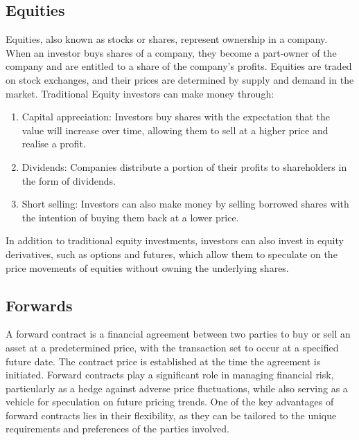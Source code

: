     \subsection{Equities}
        \label{sec:equities}

        Equities, also known as stocks or shares, represent ownership in a company.
        When an investor buys shares of a company,
        they become a part-owner of the company and are entitled to a share of the company's profits.
        Equities are traded on stock exchanges, and their prices are determined by supply and demand in the market.
        Traditional Equity investors can make money through:

        \begin{enumerate}
            \item Capital appreciation: Investors buy shares with the expectation that the value will increase over time,
                allowing them to sell at a higher price and realise a profit.
            \item Dividends: Companies distribute a portion of their profits to shareholders in the form of dividends.
            \item Short selling: Investors can also make money by selling borrowed shares with the intention of buying
                them back at a lower price.
        \end{enumerate}

        In addition to traditional equity investments,
        investors can also invest in equity derivatives, such as options and futures,
        which allow them to speculate on the price movements of equities without owning the underlying shares.

    \subsection{Forwards}
        \label{sec:forwards}

        A forward contract is a financial agreement between two parties to buy or sell an asset at a predetermined price,
        with the transaction set to occur at a specified future date.
        The contract price is established at the time the agreement is initiated.
        Forward contracts play a significant role in managing financial risk,
        particularly as a hedge against adverse price fluctuations,
        while also serving as a vehicle for speculation on future pricing trends.
        One of the key advantages of forward contracts lies in their flexibility,
        as they can be tailored to the unique requirements and preferences of the parties involved.

